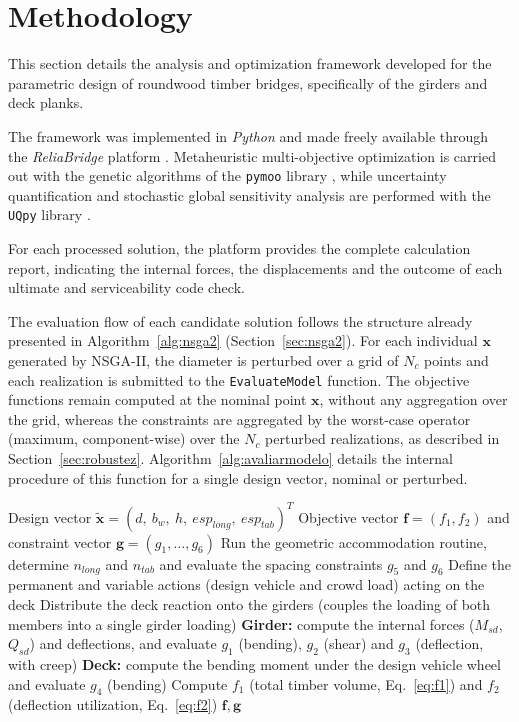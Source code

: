 \section{Methodology}\label{sec:metodologia}

This section details the analysis and optimization framework developed for the parametric design of roundwood timber bridges, specifically of the girders and deck planks.

The framework was implemented in \textit{Python} and made freely available through the \textit{ReliaBridge} platform \parencite{ReliaBridge2026}.
Metaheuristic multi-objective optimization is carried out with the genetic algorithms of the \texttt{pymoo} library \parencite{blank2020}, while uncertainty quantification and stochastic global sensitivity analysis are performed with the \texttt{UQpy} library \parencite{Olivier2020}.

For each processed solution, the platform provides the complete calculation report, indicating the internal forces, the displacements and the outcome of each ultimate and serviceability code check.

The evaluation flow of each candidate solution follows the structure already presented in Algorithm~\ref{alg:nsga2} (Section~\ref{sec:nsga2}). For each individual $\mathbf{x}$ generated by NSGA-II, the diameter is perturbed over a grid of $N_c$ points and each realization is submitted to the \texttt{EvaluateModel} function. The objective functions remain computed at the nominal point $\mathbf{x}$, without any aggregation over the grid, whereas the constraints are aggregated by the worst-case operator (maximum, component-wise) over the $N_c$ perturbed realizations, as described in Section~\ref{sec:robustez}.
Algorithm~\ref{alg:avaliarmodelo} details the internal procedure of this function for a single design vector, nominal or perturbed.

\begin{algorithm}[!ht]
\caption{EvaluateModel($\tilde{\mathbf{x}}$)}
\label{alg:avaliarmodelo}
\begin{algorithmic}[1]
\Require Design vector $\tilde{\mathbf{x}} = (d,\ b_w,\ h,\ esp_{long},\ esp_{tab})^T$
\Ensure Objective vector $\mathbf{f} = (f_1, f_2)$ and constraint vector $\mathbf{g} = (g_1,\ldots,g_6)$
\State Run the geometric accommodation routine, determine $n_{long}$ and $n_{tab}$ and evaluate the spacing constraints $g_5$ and $g_6$
\State Define the permanent and variable actions (design vehicle and crowd load) acting on the deck
\State Distribute the deck reaction onto the girders (couples the loading of both members into a single girder loading)
\State \textbf{Girder:} compute the internal forces ($M_{sd}$, $Q_{sd}$) and deflections, and evaluate $g_1$ (bending), $g_2$ (shear) and $g_3$ (deflection, with creep)
\State \textbf{Deck:} compute the bending moment under the design vehicle wheel and evaluate $g_4$ (bending)
\State Compute $f_1$ (total timber volume, Eq.~\eqref{eq:f1}) and $f_2$ (deflection utilization, Eq.~\eqref{eq:f2})
\State \Return $\mathbf{f}, \mathbf{g}$
\end{algorithmic}
\end{algorithm}

